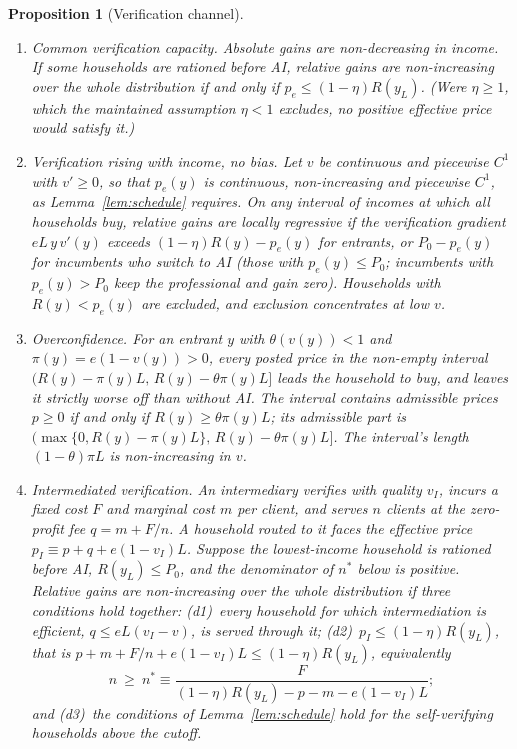 \documentclass[12pt]{article}
\newtheorem{proposition}{Proposition}
\theoremstyle{remark}
\begin{document}
\begin{proposition}[Verification channel]\label{prop:verification}
\begin{enumerate}[label=(\alph*),itemsep=1pt]
\item \emph{Common verification capacity.} Absolute gains are non-decreasing in income. If some households are rationed before AI, relative gains are non-increasing over the whole distribution \emph{if and only if} $p_e\le(1-\eta)R(y_L)$. (Were $\eta\ge1$, which the maintained assumption $\eta<1$ excludes, no positive effective price would satisfy it.)
\item \emph{Verification rising with income, no bias.} Let $v$ be continuous and piecewise $C^1$ with $v'\ge0$, so that $p_e(y)$ is continuous, non-increasing and piecewise $C^1$, as Lemma~\ref{lem:schedule} requires. On any interval of incomes at which all households buy, relative gains are locally regressive if the verification gradient $eL\,y\,v'(y)$ exceeds $(1-\eta)R(y)-p_e(y)$ for entrants, or $P_0-p_e(y)$ for incumbents who switch to AI (those with $p_e(y)\le P_0$; incumbents with $p_e(y)>P_0$ keep the professional and gain zero). Households with $R(y)<p_e(y)$ are excluded, and exclusion concentrates at low $v$.
\item \emph{Overconfidence.} For an entrant $y$ with $\theta(v(y))<1$ and $\pi(y)=e(1-v(y))>0$, every posted price in the non-empty interval $\big(R(y)-\pi(y)L,\,R(y)-\theta\pi(y)L\big]$ leads the household to buy, and leaves it strictly worse off than without AI. The interval contains admissible prices $p\ge0$ if and only if $R(y)\ge\theta\pi(y)L$; its admissible part is $\big(\max\{0,R(y)-\pi(y)L\},\,R(y)-\theta\pi(y)L\big]$. The interval's length $(1-\theta)\pi L$ is non-increasing in $v$.
\item \emph{Intermediated verification.} An intermediary verifies with quality $v_I$, incurs a fixed cost $F$ and marginal cost $m$ per client, and serves $n$ clients at the zero-profit fee $q=m+F/n$. A household routed to it faces the effective price $p_I\equiv p+q+e(1-v_I)L$. Suppose the lowest-income household is rationed before AI, $R(y_L)\le P_0$, and the denominator of $n^*$ below is positive. Relative gains are non-increasing over the whole distribution if three conditions hold together: (d1)~every household for which intermediation is efficient, $q\le eL(v_I-v)$, is served through it; (d2)~$p_I\le(1-\eta)R(y_L)$, that is $p+m+F/n+e(1-v_I)L\le(1-\eta)R(y_L)$, equivalently
\[
n\ \ge\ n^*\equiv\frac{F}{(1-\eta)R(y_L)-p-m-e(1-v_I)L};
\]
and (d3)~the conditions of Lemma~\ref{lem:schedule} hold for the self-verifying households above the cutoff.

\end{enumerate}
\end{proposition}
\end{document}
